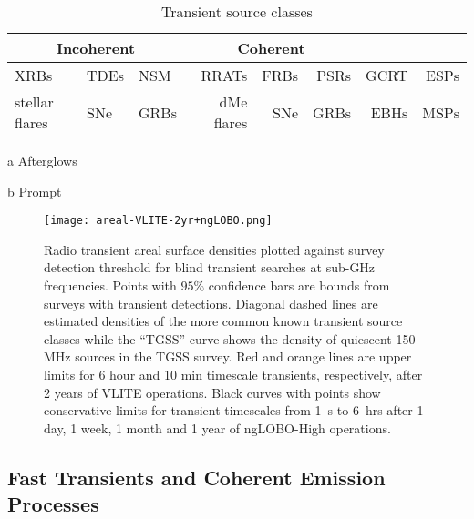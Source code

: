 \documentclass[11pt]{article}
\begin{document}
\begin{table}
\centering
\vspace{0.2cm}
\begin{threeparttable}
\caption{Transient source classes}\label{tabTRANS}
\begin{tabular}{l l l|r r r r r}
\hline
\multicolumn{3}{c}{Incoherent} & \multicolumn{3}{c}{Coherent}\\
\hline\hline
XRBs & TDEs & NSM & RRATs & FRBs & PSRs & GCRT & ESPs\\
stellar flares & SNe\tnote{a} & GRBs\tnote{a} & dMe flares & SNe\tnote{b} & GRBs\tnote{b} & EBHs & MSPs\\
\hline
\end{tabular}
\begin{tablenotes}\footnotesize
\item [a] Afterglows
\item [b] Prompt
\end{tablenotes}
\end{threeparttable}
\end{table}

\begin{figure}[t!]
\begin{center}
\vspace{-1cm}
\texttt{[image: areal-VLITE-2yr+ngLOBO.png]}
\end{center}
\vspace{-0.5cm}
  \caption{Radio transient areal surface densities plotted against survey detection threshold for blind transient searches at sub-GHz frequencies. Points with $95\%$ confidence bars are bounds from surveys with transient detections. Diagonal dashed lines are estimated densities of the more common known transient source classes while the ``TGSS'' curve shows the density of quiescent 150 MHz sources in the TGSS survey. Red and orange lines are upper limits for 6 hour and 10 min timescale transients, respectively, after 2 years of VLITE operations. Black curves with points show conservative limits for transient timescales from 1~s to 6~hrs after 1 day, 1 week, 1 month and 1 year of ngLOBO-High operations.}  
\label{ngloboAREAL}
\end{figure}

\subsection{Fast Transients and Coherent Emission Processes}
\end{document}
